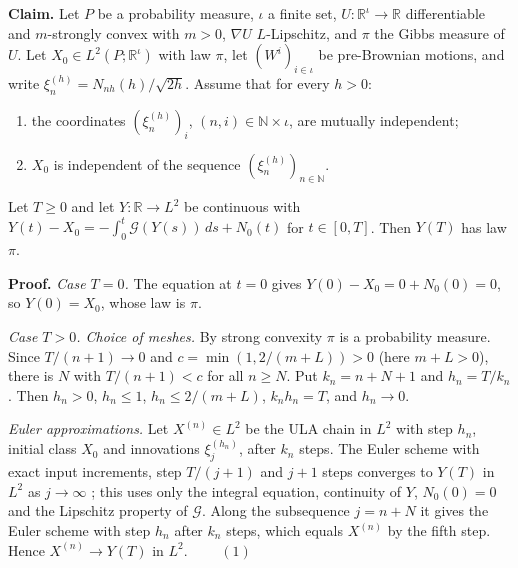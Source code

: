 \documentclass[11pt,a4paper]{article}
\begin{document}
\textbf{Claim.} Let \(P\) be a probability measure, \(\iota\) a finite set, \(U:\mathbb R^\iota\to\mathbb R\) differentiable and \(m\)-strongly convex with \(m>0\), \(\nabla U\) \(L\)-Lipschitz, and \(\pi\) the Gibbs measure of \(U\). Let \(X_0\in L^2(P;\mathbb R^\iota)\) with law \(\pi\), let \((W^i)_{i\in\iota}\) be pre-Brownian motions, and write \(\xi^{(h)}_n=N_{nh}(h)/\sqrt{2h}\). Assume that for every \(h>0\):



\begin{enumerate}


\item the coordinates \((\xi^{(h)}_n)_i\), \((n,i)\in\mathbb N\times\iota\), are mutually independent;

\item \(X_0\) is independent of the sequence \((\xi^{(h)}_n)_{n\in\mathbb N}\).

\end{enumerate}



Let \(T\ge0\) and let \(Y:\mathbb R\to L^2\) be continuous with \(Y(t)-X_0=-\int_0^t\mathcal G(Y(s))\,ds+N_0(t)\) for \(t\in[0,T]\). Then \(Y(T)\) has law \(\pi\).




\textbf{Proof.} \emph{Case \(T=0\).} The equation at \(t=0\) gives \(Y(0)-X_0=0+N_0(0)=0\), so \(Y(0)=X_0\), whose law is \(\pi\).




\emph{Case \(T>0\). Choice of meshes.} By strong convexity \(\pi\) is a probability measure. Since \(T/(n+1)\to0\) and \(c=\min(1,2/(m+L))>0\) (here \(m+L>0\)), there is \(N\) with \(T/(n+1)<c\) for all \(n\ge N\). Put \(k_n=n+N+1\) and \(h_n=T/k_n\). Then \(h_n>0\), \(h_n\le1\), \(h_n\le2/(m+L)\), \(k_nh_n=T\), and \(h_n\to0\).




\emph{Euler approximations.} Let \(X^{(n)}\in L^2\) be the ULA chain in \(L^2\) with step \(h_n\), initial class \(X_0\) and innovations \(\xi^{(h_n)}_j\), after \(k_n\) steps. The Euler scheme with exact input increments, step \(T/(j+1)\) and \(j+1\) steps converges to \(Y(T)\) in \(L^2\) as \(j\to\infty\) \cite[Section~3.16.9]{LangevinLean2026ULASC}; this uses only the integral equation, continuity of \(Y\), \(N_0(0)=0\) and the Lipschitz property of \(\mathcal G\). Along the subsequence \(j=n+N\) it gives the Euler scheme with step \(h_n\) after \(k_n\) steps, which equals \(X^{(n)}\) by the fifth step. Hence \(X^{(n)}\to Y(T)\) in \(L^2\). \(\qquad(1)\)
\end{document}
